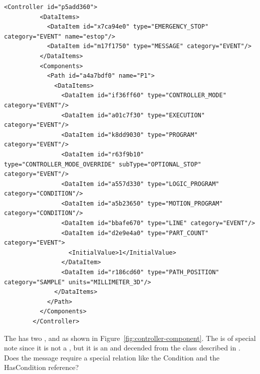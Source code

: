 \begin{lstlisting}[firstnumber=last,%
    caption={Controller and Path Components and Their Data Items},label={lst:controller-component}]
        <Controller id="p5add360">
          <DataItems>
            <DataItem id="x7ca94e0" type="EMERGENCY_STOP" category="EVENT" name="estop"/>
            <DataItem id="m17f1750" type="MESSAGE" category="EVENT"/>
          </DataItems>
          <Components>
            <Path id="a4a7bdf0" name="P1">
              <DataItems>
                <DataItem id="if36ff60" type="CONTROLLER_MODE" category="EVENT"/>
                <DataItem id="a01c7f30" type="EXECUTION" category="EVENT"/>
                <DataItem id="k8dd9030" type="PROGRAM" category="EVENT"/>
                <DataItem id="r63f9b10" type="CONTROLLER_MODE_OVERRIDE" subType="OPTIONAL_STOP" category="EVENT"/>
                <DataItem id="a557d330" type="LOGIC_PROGRAM" category="CONDITION"/>
                <DataItem id="a5b23650" type="MOTION_PROGRAM" category="CONDITION"/>
                <DataItem id="bbafe670" type="LINE" category="EVENT"/>
                <DataItem id="d2e9e4a0" type="PART_COUNT" category="EVENT">
                  <InitialValue>1</InitialValue>
                </DataItem>
                <DataItem id="r186cd60" type="PATH_POSITION" category="SAMPLE" units="MILLIMETER_3D"/>
              </DataItems>
            </Path>
          </Components>
        </Controller>
\end{lstlisting}

The  has two ,  and  as shown in Figure~\ref{fig:controller-component}. The  is of special note since it is not a , but it is an  and decended from the  class described in \cite{UAPart5}. {\color{red} Does the message require a special relation like the Condition and the HasCondition reference?}

